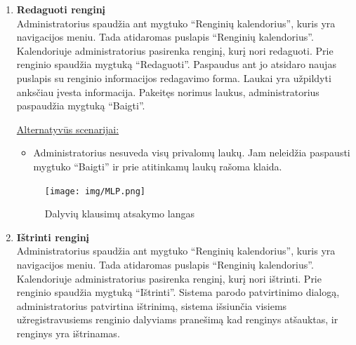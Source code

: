 \documentclass{VUMIFPSkursinis}
\begin{document}
\begin{enumerate} [label = \textbf{U\arabic*.}]
					\underline{Alternatyvūs scenarijai:}
					\begin{itemize}
						\item Administratorius nesuveda visų privalomų laukų. Jam neleidžia paspausti mygtuko “Baigti” ir prie atitinkamų laukų rašoma klaida.
					\end{itemize}
				
				\begin{figure}[H]
					\centering
					\texttt{[image: img/MLP.png]}
					\caption{Dalyvių klausimų atsakymo langas}
					\label{fig:atsakyti-klausimus}
				\end{figure}
				
			\item \textbf{Redaguoti renginį}   \\
					Administratorius spaudžia ant mygtuko “Renginių kalendorius”, kuris yra navigacijos meniu. Tada atidaromas puslapis “Renginių kalendorius”. Kalendoriuje administratorius pasirenka renginį, kurį nori redaguoti. Prie renginio spaudžia mygtuką “Redaguoti”. Paspaudus ant jo atsidaro naujas puslapis su renginio informacijos redagavimo forma. Laukai yra užpildyti anksčiau įvesta informacija. Pakeitęs norimus laukus, administratorius paspaudžia mygtuką “Baigti”.
					
					\underline{Alternatyvūs scenarijai:}
					\begin{itemize}
						\item Administratorius nesuveda visų privalomų laukų. Jam neleidžia paspausti mygtuko “Baigti” ir prie atitinkamų laukų rašoma klaida.
					\end{itemize}
				
				\begin{figure}[H]
					\centering
					\texttt{[image: img/MLP.png]}
					\caption{Dalyvių klausimų atsakymo langas}
					\label{fig:atsakyti-klausimus}
				\end{figure}
				
			\item \textbf{Ištrinti renginį}   \\
					Administratorius spaudžia ant mygtuko “Renginių kalendorius”, kuris yra navigacijos meniu. Tada atidaromas puslapis “Renginių kalendorius”. Kalendoriuje administratorius pasirenka renginį, kurį nori ištrinti. Prie renginio spaudžia mygtuką “Ištrinti”. Sistema parodo patvirtinimo dialogą, administratorius patvirtina ištrinimą, sistema išsiunčia visiems užregistravusiems renginio dalyviams pranešimą kad renginys atšauktas, ir renginys yra ištrinamas.
					

\end{enumerate}
\end{document}
